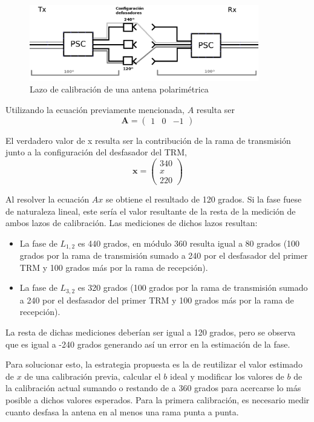 \begin{figure}[H]
 \centering
 \includegraphics[width=10cm]{gfx/loopCal.png}
 \caption{Lazo de calibración de una antena polarimétrica}
 \label{fig:phaseDetermination}
\end{figure}

Utilizando la ecuación previamente mencionada, $A$ resulta ser
$$
	\mathbf{A} = \begin{pmatrix} 1 & 0 & -1\end{pmatrix}
$$

El verdadero valor de x resulta ser la contribución de la rama de transmisión junto a la configuración del desfasador del TRM,
$$
	\mathbf{x} = \begin{pmatrix} 340 \\ x \\ 220\end{pmatrix}
$$

Al resolver la ecuación $Ax$ se obtiene el resultado de 120 grados. Si la fase fuese de naturaleza lineal, este sería el valor 
resultante de la resta de la medición de ambos lazos de calibración. Las mediciones de dichos lazos resultan: 
\begin{itemize}
	\item La fase de $L_{1,2}$ es 440 grados, en módulo 360 resulta igual a 80 grados (100 grados por la rama de
		transmisión sumado a 240 por el desfasador del primer TRM y 100 grados más por la rama de recepción).
	\item La fase de $L_{3, 2}$ es 320 grados (100 grados por la rama de transmisión sumado a 240 por el desfasador
		del primer TRM y 100 grados más por la rama de recepción).
\end{itemize}

La resta de dichas mediciones deberían ser igual a 120 grados, pero se observa que es igual a -240 grados generando así un
error en la estimación de la fase.

Para solucionar esto, la estrategia propuesta es la de reutilizar el valor estimado de $x$ de una calibración previa, calcular
el $b$ ideal y modificar los valores de $b$ de la calibración actual sumando o restando de a 360 grados para acercarse lo más 
posible a dichos valores esperados. Para la primera calibración, es necesario medir cuanto desfasa la antena en al menos una 
rama punta a punta. 


